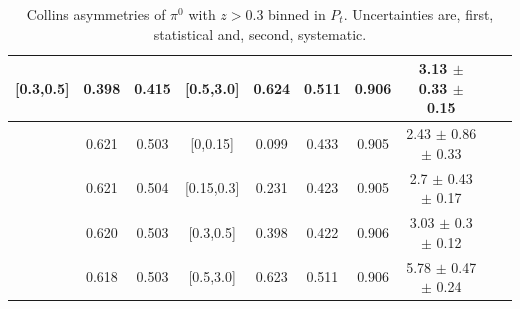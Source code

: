 \begin{table}[H]
\begin{tabular}{|c| c| c| c| c| c| c| c| c| c|}
[0.3,0.5]	&	0.398	&	0.415	&	[0.5,3.0]	&	0.624	&	0.511	&	0.906	&3.13  $\pm$ 0.33  $\pm$ 0.15    	\\ \hline
\hline
[0.5,3.0]	&	0.621	&	0.503	&	[0,0.15]	&	0.099	&	0.433	&	0.905	&2.43  $\pm$ 0.86  $\pm$ 0.33    	\\ \hline
[0.5,3.0]	&	0.621	&	0.504	&	[0.15,0.3]	&	0.231	&	0.423	&	0.905	&2.7  $\pm$ 0.43  $\pm$ 0.17     	\\ \hline
[0.5,3.0]	&	0.620	&	0.503	&	[0.3,0.5]	&	0.398	&	0.422	&	0.906	&3.03  $\pm$ 0.3  $\pm$ 0.12     	\\ \hline
[0.5,3.0]	&	0.618	&	0.503	&	[0.5,3.0]	&	0.623	&	0.511	&	0.906	&5.78  $\pm$ 0.47  $\pm$ 0.24    	\\ \hline
\end{tabular}
\caption[Collins asymmetries of $\pi^0$ with $z>0.3$ binned in $P_t$]{Collins asymmetries of $\pi^0$ with $z>0.3$ binned in $P_t$. Uncertainties are, first, statistical and, second, systematic.}\label{tab:finaletaptbin2}
\end{table}

